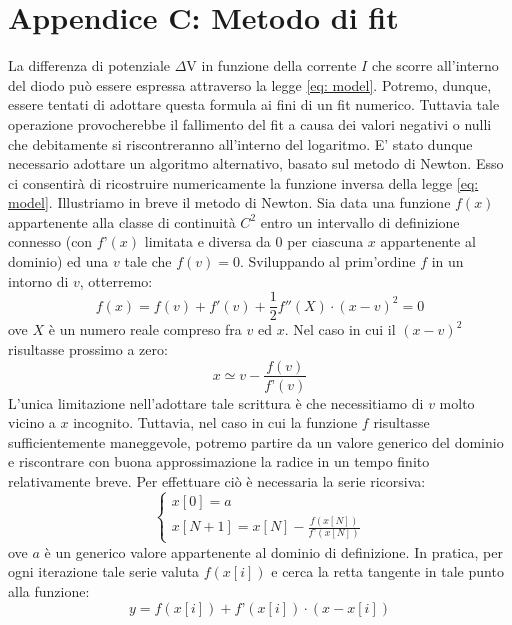 \documentclass{article}[a4paper, oneside, 11pt]
\begin{document}
\section{Appendice C: Metodo di fit}\label{app: C}
La differenza di potenziale $\Delta$V in funzione della corrente $I$ che scorre 
all’interno del diodo pu\`o essere espressa attraverso la legge
\eqref{eq: model}. Potremo, dunque, essere tentati di adottare questa formula
ai fini di un fit numerico. 
Tuttavia tale operazione provocherebbe il fallimento del fit a causa dei valori 
negativi o nulli che debitamente si riscontreranno all’interno del logaritmo. 
E’ stato dunque necessario adottare un algoritmo alternativo, basato sul 
metodo di Newton\cite{tesi}. Esso ci consentir\`a di ricostruire numericamente 
la funzione inversa della legge \eqref{eq: model}.
Illustriamo in breve il metodo di Newton. Sia data una funzione $f(x)$
appartenente alla classe di continuit\`a $C^{2}$
entro un intervallo di definizione connesso (con $f’(x)$ limitata e 
diversa da $0$ per ciascuna $x$ appartenente al dominio) ed una $v$ tale che
$f(v) = 0$. Sviluppando al prim’ordine $f$ in un intorno di $v$, otterremo:
\begin{equation}
f(x) = f(v) + f{'}(v) + {\frac{1}{2}} {f{''}(X)} \cdot  {( x - v)^2} = 0
\end{equation}
ove $X$ \`e un numero reale compreso fra $v$ ed $x$. Nel caso in cui il $(x-v)^2 
$risultasse prossimo a zero:
\begin{equation}
x \simeq v   -  {\frac {f(v)}{f’(v)}}
\end{equation}
L’unica limitazione nell'adottare tale scrittura \`e che necessitiamo di $v$ 
molto vicino a $x$ incognito. Tuttavia, nel caso in cui la funzione $f$ risultasse 
sufficientemente maneggevole, potremo partire da un valore generico del dominio 
e riscontrare con buona approssimazione la radice in un tempo finito 
relativamente breve. Per effettuare ci\`o  \`e necessaria la serie ricorsiva:
\begin{equation}
\begin{cases}
x[0] = a \\ x[N+1] = x[N] - \frac {f(x[N])} {f’(x[N])}
\end{cases}
\end{equation}
ove $a$ \`e un generico valore appartenente al dominio di definizione. In pratica, 
per ogni iterazione tale serie valuta $f(x[i])$ e cerca la retta tangente in tale 
punto alla funzione:
\begin{equation}
y = f(x[i]) + f’(x[i]) \cdot (x-x[i])
\end{equation}
\end{document}
